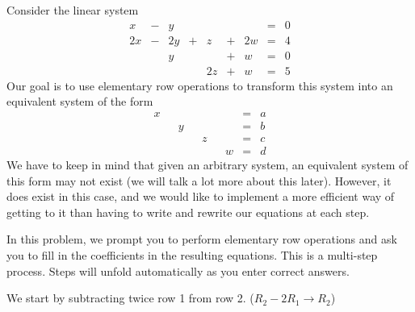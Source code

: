 \documentclass{ximera}
\begin{document}
\begin{exploration}\label{init:augmentedmatrixex}
Consider the linear system
\begin{equation}\label{eq:sys20originalsystem1}
\begin{array}{ccccccccc}
      x &- &y&&&&&= &0 \\
	 2x& -&2y&+&z&+&2w&=&4\\
     & &y&&&+&w&=&0\\
     & &&&2z&+&w&=&5
    \end{array}
    \end{equation}
Our goal is to use elementary row operations to transform this system into an equivalent system of the form
\begin{equation}\begin{array}{ccccccccc}
      x & &&&&&&= &a \\
	 & &y&&&&&=&b\\
     & &&&z&&&=&c\\
     & &&&&&w&=&d
    \end{array}
    \end{equation}
 We have to keep in mind that given an arbitrary system, an equivalent system of this form may not exist (we will talk a lot more about this later).  However, it does exist in this case, and we would like to implement a more efficient way of getting to it than having to write and rewrite our equations at each step.   
 
In this problem, we prompt you to perform elementary row operations and ask you to fill in the coefficients in the resulting equations.  This is a multi-step process.  Steps will unfold automatically as you enter correct answers.
\begin{problem}
We start by subtracting twice row 1 from row 2. ($R_2-2R_1\rightarrow R_2$)


\end{problem}
\end{exploration}
\end{document}
